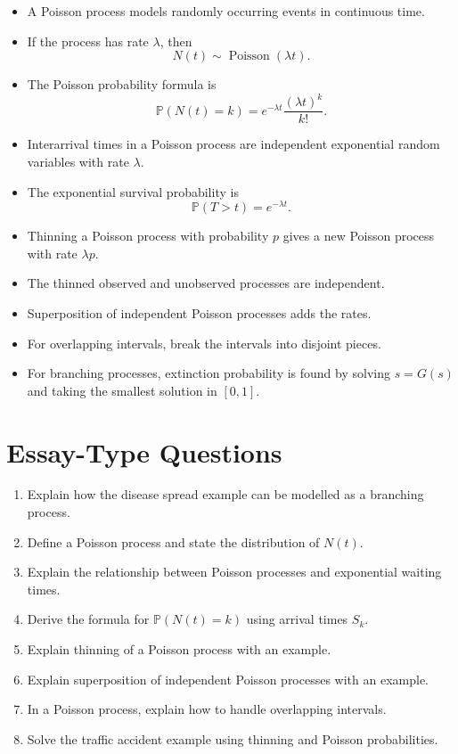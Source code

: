 \documentclass[12pt,a4paper]{article}
\theoremstyle{lecturestyle}
\newcommand{\Prob}{\mathbb{P}}
\begin{document}
\begin{itemize}[leftmargin=1.2cm]
    \item A Poisson process models randomly occurring events in continuous time.
    \item If the process has rate $\lambda$, then
    \[
    N(t)\sim \operatorname{Poisson}(\lambda t).
    \]
    \item The Poisson probability formula is
    \[
    \Prob(N(t)=k)=e^{-\lambda t}\frac{(\lambda t)^k}{k!}.
    \]
    \item Interarrival times in a Poisson process are independent exponential random variables with rate $\lambda$.
    \item The exponential survival probability is
    \[
    \Prob(T>t)=e^{-\lambda t}.
    \]
    \item Thinning a Poisson process with probability $p$ gives a new Poisson process with rate $\lambda p$.
    \item The thinned observed and unobserved processes are independent.
    \item Superposition of independent Poisson processes adds the rates.
    \item For overlapping intervals, break the intervals into disjoint pieces.
    \item For branching processes, extinction probability is found by solving $s=G(s)$ and taking the smallest solution in $[0,1]$.
\end{itemize}

\section{Essay-Type Questions}

\begin{enumerate}[label=\textbf{Q\arabic*.}, leftmargin=1.2cm]
    \item Explain how the disease spread example can be modelled as a branching process.
    \item Define a Poisson process and state the distribution of $N(t)$.
    \item Explain the relationship between Poisson processes and exponential waiting times.
    \item Derive the formula for $\Prob(N(t)=k)$ using arrival times $S_k$.
    \item Explain thinning of a Poisson process with an example.
    \item Explain superposition of independent Poisson processes with an example.
    \item In a Poisson process, explain how to handle overlapping intervals.
    \item Solve the traffic accident example using thinning and Poisson probabilities.
\end{enumerate}
\end{document}

